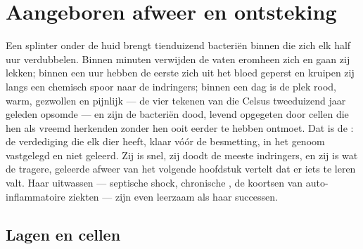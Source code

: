\chapter{Aangeboren afweer en ontsteking}\label{ch:b3:innate-immunity}

Een splinter onder de huid brengt tienduizend bacteriën binnen die zich
elk half uur verdubbelen. Binnen minuten verwijden de vaten eromheen
zich en gaan zij lekken; binnen een uur hebben de eerste 
zich uit het bloed geperst en kruipen zij langs een chemisch spoor naar
de indringers; binnen een dag is de plek rood, warm, gezwollen en
pijnlijk --- de vier tekenen van  die Celsus tweeduizend jaar
geleden opsomde --- en zijn de bacteriën dood, levend opgegeten door
cellen die hen als vreemd herkenden zonder hen ooit eerder te hebben
ontmoet. Dat is de : de verdediging die elk dier
heeft, klaar vóór de besmetting, in het genoom vastgelegd en niet
geleerd. Zij is snel, zij doodt de meeste indringers, en zij is wat de
tragere, geleerde afweer van het volgende hoofdstuk vertelt dat er iets
te leren valt. Haar uitwassen --- septische shock, chronische
, de koortsen van auto-inflammatoire ziekten --- zijn even
leerzaam als haar successen.

\section{Lagen en cellen}

